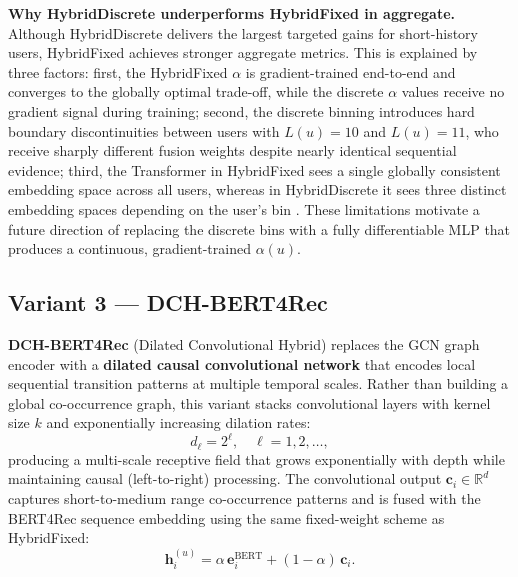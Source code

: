 \documentclass[12pt,a4paper]{report}
\newcommand{\parencite}[1]{\citep{#1}}
\begin{document}
\textbf{Why HybridDiscrete underperforms HybridFixed in aggregate.}
Although HybridDiscrete delivers the largest targeted gains for
short-history users, HybridFixed achieves stronger aggregate
metrics. This is explained by three factors: first, the
HybridFixed $\alpha$ is gradient-trained end-to-end and converges
to the globally optimal trade-off, while the discrete $\alpha$
values receive no gradient signal during training; second, the
discrete binning introduces hard boundary discontinuities between
users with $L(u) = 10$ and $L(u) = 11$, who receive sharply
different fusion weights despite nearly identical sequential
evidence; third, the Transformer in HybridFixed sees a single
globally consistent embedding space across all users, whereas
in HybridDiscrete it sees three distinct embedding spaces
depending on the user's bin \parencite{ouledmeriem2025hybrid}.
These limitations motivate a future direction of replacing the
discrete bins with a fully differentiable MLP that produces a
continuous, gradient-trained $\alpha(u)$.

\subsection{Variant 3 — DCH-BERT4Rec}

\textbf{DCH-BERT4Rec} (Dilated Convolutional Hybrid) replaces
the GCN graph encoder with a \textbf{dilated causal convolutional
network} \parencite{bai2018tcn} that encodes local sequential
transition patterns at multiple temporal scales. Rather than
building a global co-occurrence graph, this variant stacks
convolutional layers with kernel size $k$ and exponentially
increasing dilation rates:
\begin{equation}
  d_\ell = 2^\ell, \quad \ell = 1, 2, \ldots,
\end{equation}
producing a multi-scale receptive field that grows exponentially
with depth while maintaining causal (left-to-right) processing.
The convolutional output $\mathbf{c}_i \in \mathbb{R}^d$ captures
short-to-medium range co-occurrence patterns and is fused with
the BERT4Rec sequence embedding using the same fixed-weight
scheme as HybridFixed:
\begin{equation}
  \mathbf{h}_i^{(u)} = \alpha\, \mathbf{e}_i^{\text{BERT}}
                      + (1 - \alpha)\, \mathbf{c}_i.
\end{equation}
\end{document}
